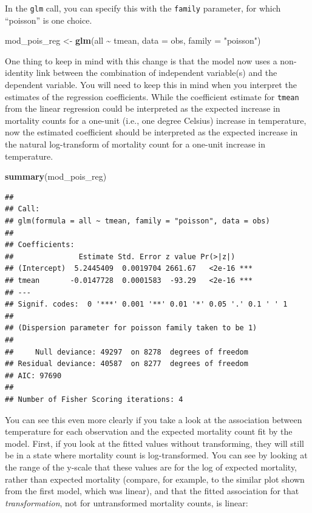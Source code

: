\documentclass[
]{book}
\newenvironment{Shaded}{\begin{snugshade}}{\end{snugshade}}
\newcommand{\AttributeTok}[1]{\textcolor[rgb]{0.13,0.29,0.53}{#1}}
\newcommand{\FunctionTok}[1]{\textcolor[rgb]{0.13,0.29,0.53}{\textbf{#1}}}
\newcommand{\NormalTok}[1]{#1}
\newcommand{\OtherTok}[1]{\textcolor[rgb]{0.56,0.35,0.01}{#1}}
\newcommand{\SpecialCharTok}[1]{\textcolor[rgb]{0.81,0.36,0.00}{\textbf{#1}}}
\newcommand{\StringTok}[1]{\textcolor[rgb]{0.31,0.60,0.02}{#1}}
\begin{document}
In the \texttt{glm} call, you can specify this with the \texttt{family}
parameter, for which ``poisson'' is one choice.

\begin{Shaded}
\begin{Highlighting}[]
\NormalTok{mod\_pois\_reg }\OtherTok{\textless{}{-}} \FunctionTok{glm}\NormalTok{(all }\SpecialCharTok{\textasciitilde{}}\NormalTok{ tmean, }\AttributeTok{data =}\NormalTok{ obs, }\AttributeTok{family =} \StringTok{"poisson"}\NormalTok{)}
\end{Highlighting}
\end{Shaded}

One thing to keep in mind with this change is that the model now uses a
non-identity link between the combination of independent variable(s) and the
dependent variable. You will need to keep this in mind when you interpret
the estimates of the regression coefficients. While the coefficient estimate
for \texttt{tmean} from the linear regression could be interpreted as the expected
increase in mortality counts for a one-unit (i.e., one degree Celsius) increase
in temperature, now the estimated coefficient should be interpreted as the
expected increase in the natural log-transform of mortality count for a one-unit
increase in temperature.

\begin{Shaded}
\begin{Highlighting}[]
\FunctionTok{summary}\NormalTok{(mod\_pois\_reg)}
\end{Highlighting}
\end{Shaded}

\begin{verbatim}
## 
## Call:
## glm(formula = all ~ tmean, family = "poisson", data = obs)
## 
## Coefficients:
##               Estimate Std. Error z value Pr(>|z|)    
## (Intercept)  5.2445409  0.0019704 2661.67   <2e-16 ***
## tmean       -0.0147728  0.0001583  -93.29   <2e-16 ***
## ---
## Signif. codes:  0 '***' 0.001 '**' 0.01 '*' 0.05 '.' 0.1 ' ' 1
## 
## (Dispersion parameter for poisson family taken to be 1)
## 
##     Null deviance: 49297  on 8278  degrees of freedom
## Residual deviance: 40587  on 8277  degrees of freedom
## AIC: 97690
## 
## Number of Fisher Scoring iterations: 4
\end{verbatim}

You can see this even more clearly if you take a look at the association between
temperature for each observation and the expected mortality count fit by the
model. First, if you look at the fitted values without transforming, they
will still be in a state where mortality count is log-transformed. You can
see by looking at the range of the y-scale that these values are for the log
of expected mortality, rather than expected mortality (compare, for example, to
the similar plot shown from the first model, which was linear), and that the fitted
association for that \emph{transformation}, not for untransformed mortality counts, is linear:
\end{document}
